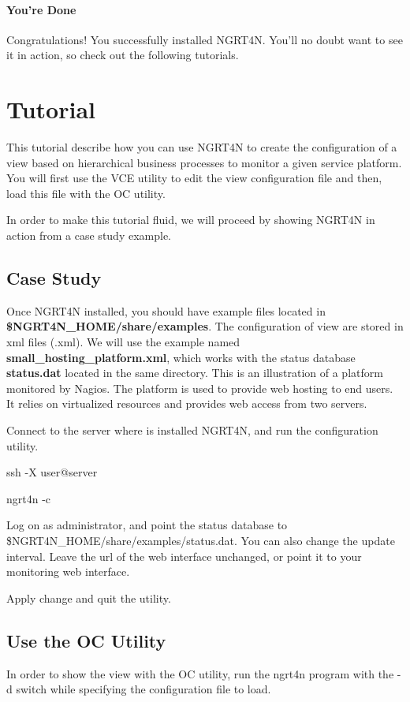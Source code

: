 \documentclass[a4paper,9pt]{article}
\begin{document}
\paragraph{You're Done}
Congratulations! You successfully installed NGRT4N. You'll no doubt want to see it in action, so check out the following tutorials.

\section{Tutorial}
This tutorial describe how you can use NGRT4N to create the configuration of a view based on hierarchical business processes to monitor a given service platform. You will first use the VCE utility to edit the view configuration file and then, load this file with the OC utility.

In order to make this tutorial fluid, we will proceed by showing NGRT4N in action from a case study example. 

\subsection{Case Study}
Once NGRT4N installed, you should have example files located in {\bf \$NGRT4N_HOME/share/examples}. The configuration of view are stored in xml files (.xml). We will use the example named {\bf small_hosting_platform.xml}, which works with the status database {\bf status.dat} located in the same directory. This is an illustration of a platform monitored by Nagios. The platform is used to provide web hosting to end users. It relies on virtualized resources and provides web access from two servers.

Connect to the server where is installed NGRT4N, and run the configuration utility.

ssh -X user@server

ngrt4n -c

Log on as administrator, and point the status database to \$NGRT4N_HOME/share/examples/status.dat. You can also change the update interval. Leave the url of the web interface unchanged, or point it to your monitoring web interface. 

Apply change and quit the utility.

\subsection{Use the OC Utility}
In order to show the view with the OC utility, run the ngrt4n program with the -d switch while specifying the configuration file to load. 
\end{document}
